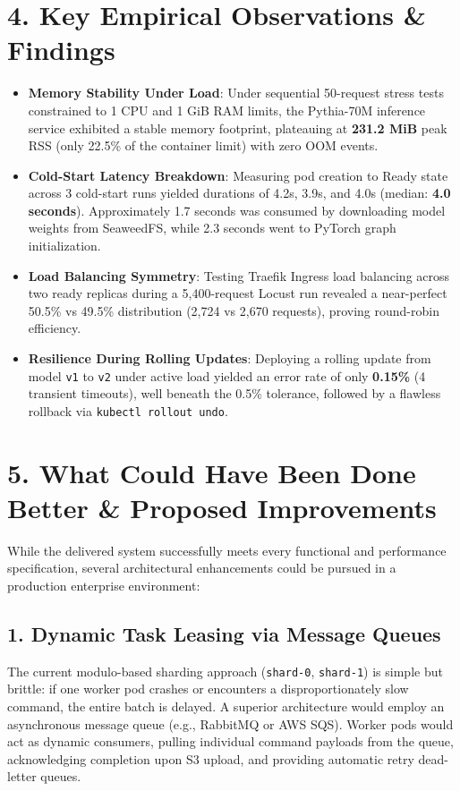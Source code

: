 \documentclass[10pt,a4paper]{article}
\begin{document}
\section*{4. Key Empirical Observations \& Findings}

\begin{itemize}[leftmargin=*,itemsep=0.3em]
    \item \textbf{Memory Stability Under Load}: Under sequential 50-request stress tests constrained to 1 CPU and 1 GiB RAM limits, the Pythia-70M inference service exhibited a stable memory footprint, plateauing at \textbf{231.2 MiB} peak RSS (only 22.5\% of the container limit) with zero OOM events.
    \item \textbf{Cold-Start Latency Breakdown}: Measuring pod creation to Ready state across 3 cold-start runs yielded durations of 4.2s, 3.9s, and 4.0s (median: \textbf{4.0 seconds}). Approximately 1.7 seconds was consumed by downloading model weights from SeaweedFS, while 2.3 seconds went to PyTorch graph initialization.
    \item \textbf{Load Balancing Symmetry}: Testing Traefik Ingress load balancing across two ready replicas during a 5,400-request Locust run revealed a near-perfect 50.5\% vs 49.5\% distribution (2,724 vs 2,670 requests), proving round-robin efficiency.
    \item \textbf{Resilience During Rolling Updates}: Deploying a rolling update from model \texttt{v1} to \texttt{v2} under active load yielded an error rate of only \textbf{0.15\%} (4 transient timeouts), well beneath the 0.5\% tolerance, followed by a flawless rollback via \texttt{kubectl rollout undo}.
\end{itemize}

\newpage

\section*{5. What Could Have Been Done Better \& Proposed Improvements}

While the delivered system successfully meets every functional and performance specification, several architectural enhancements could be pursued in a production enterprise environment:

\subsection*{1. Dynamic Task Leasing via Message Queues}
The current modulo-based sharding approach (\texttt{shard-0}, \texttt{shard-1}) is simple but brittle: if one worker pod crashes or encounters a disproportionately slow command, the entire batch is delayed. A superior architecture would employ an asynchronous message queue (e.g., RabbitMQ or AWS SQS). Worker pods would act as dynamic consumers, pulling individual command payloads from the queue, acknowledging completion upon S3 upload, and providing automatic retry dead-letter queues.
\end{document}
